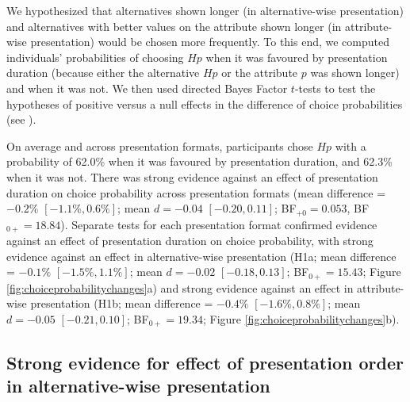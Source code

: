 \documentclass[11pt, a4paper, twocolumn, abstract]{scrartcl}
\begin{document}
We hypothesized that alternatives shown longer (in alternative-wise presentation) and alternatives with better values on the attribute shown longer (in attribute-wise presentation) would be chosen more frequently. 
To this end, we computed individuals' probabilities of choosing $Hp$ when it was favoured by presentation duration (because either the alternative $Hp$ or the attribute $p$ was shown longer) and when it was not. We then used directed Bayes Factor $t$-tests to test the hypotheses of positive versus a null effects in the difference of choice probabilities (see ). 

On average and across presentation formats, participants chose $Hp$ with a probability of 62.0\% when it was favoured by presentation duration, and 62.3\% when it was not.
There was strong evidence against an effect of presentation duration on choice probability across presentation formats (mean difference = $-0.2\%$ $[-1.1\%, 0.6\%]$; mean $d = -0.04$ $[-0.20, 0.11]$; BF$_{{+}0} = 0.053$, BF$_{0{+}} = 18.84$).
Separate tests for each presentation format confirmed evidence against an effect of presentation duration on choice probability, with strong evidence against an effect in alternative-wise presentation (H1a; mean difference = $-0.1\%$ $[-1.5\%, 1.1\%]$; mean $d = -0.02$ $[-0.18, 0.13]$; BF$_{0{+}} = 15.43$; Figure \ref{fig:choiceprobabilitychanges}a) and strong evidence against an effect in attribute-wise presentation (H1b; mean difference = $-0.4\%$ $[-1.6\%, 0.8\%]$; mean $d = -0.05$ $[-0.21, 0.10]$; BF$_{0{+}} = 19.34$; Figure \ref{fig:choiceprobabilitychanges}b). 

\subsection*{Strong evidence for effect of presentation order in alternative-wise presentation}
\end{document}
